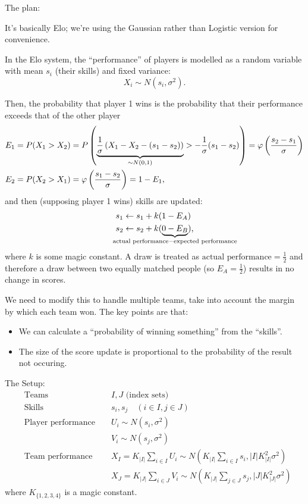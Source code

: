 \documentclass{article}
\begin{document}
The plan:

It's basically Elo; we're using the Gaussian rather than Logistic version for convenience.

In the Elo system, the ``performance'' of players is modelled as a random variable with mean $s_i$ (their skills) and fixed variance:
\[
    X_i \sim N(s_i, \sigma^2)
    \text{.}
\]

Then, the probability that player 1 wins is the probability that their performance exceeds that of the other player
\begin{align*}
    E_1 &= P(X_1 > X_2) = P \left( \underbrace{ \frac{1}{\sigma} \left( X_1 - X_2 - (s_1 - s_2) \right) }_{\mathclap{\sim N(0, 1)}}
                        > - \frac{1}{\sigma} (s_1 - s_2) \right)
         = \varphi\left( \frac{s_2 - s_1}{\sigma} \right) \\
    E_2 &= P(X_2 > X_1) = \varphi\left( \frac{s_1 - s_2}{\sigma} \right) = 1 - E_1
    \text{,}
\end{align*}
and then (supposing player 1 wins) skills are updated:
\begin{align*}
    s_1 &\leftarrow s_1 + k ( 1 - E_A ) \\
    s_2 &\leftarrow s_2 + k ( \underbrace{0 - E_B}_{\mathclap{\text{actual performance} - \text{expected performance}}} )
    \text{,}
\end{align*}
where $k$ is some magic constant. A draw is treated as $\text{actual performance} = \frac{1}{2}$ and therefore a draw between two equally matched people (so $E_A = \frac{1}{2}$) results in no change in scores.

We need to modify this to handle multiple teams, take into account the margin by which each team won. The key points are that:
\begin{itemize}
    \item We can calculate a ``probability of winning something'' from the ``skills''.
    \item The size of the score update is proportional to the probability of the result not occuring.
\end{itemize}

The Setup:
\begin{align*}
    &\text{Teams } && I, J \text{ (index sets)} \\
    &\text{Skills } && s_i, s_j \quad (i \in I, j \in J) \\
    &\text{Player performance } && U_i \sim N(s_i, \sigma^2) \\
    &                           && V_i \sim N(s_j, \sigma^2) \\
    &\text{Team performance } && X_I = K_{|I|} \sum_{i \in I} U_i \sim N(K_{|I|} \sum_{i \in I} s_i, |I| K_{|I|}^2 \sigma^2) \\
    &                         && X_J = K_{|J|} \sum_{i \in J} V_i \sim N(K_{|J|} \sum_{j \in J} s_j, |J| K_{|J|}^2 \sigma^2)
\end{align*}
where $K_{\{1,2,3,4\}}$ is a magic constant.
\end{document}
